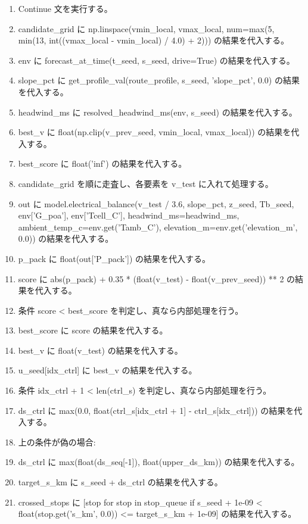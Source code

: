 \documentclass[a4paper,11pt]{article}
\begin{document}
\begin{enumerate}[leftmargin=1.8em]
\item     Continue 文を実行する。
\item   candidate\_grid に np.linspace(vmin\_local, vmax\_local, num=max(5, min(13, int((vmax\_local - vmin\_local) / 4.0) + 2))) の結果を代入する。
\item   env に forecast\_at\_time(t\_seed, s\_seed, drive=True) の結果を代入する。
\item   slope\_pct に get\_profile\_val(route\_profile, s\_seed, 'slope\_pct', 0.0) の結果を代入する。
\item   headwind\_ms に resolved\_headwind\_ms(env, s\_seed) の結果を代入する。
\item   best\_v に float(np.clip(v\_prev\_seed, vmin\_local, vmax\_local)) の結果を代入する。
\item   best\_score に float('inf') の結果を代入する。
\item   candidate\_grid を順に走査し、各要素を v\_test に入れて処理する。
\item     out に model.electrical\_balance(v\_test / 3.6, slope\_pct, z\_seed, Tb\_seed, env['G\_poa'], env['Tcell\_C'], headwind\_ms=headwind\_ms, ambient\_temp\_c=env.get('Tamb\_C'), elevation\_m=env.get('elevation\_m', 0.0)) の結果を代入する。
\item     p\_pack に float(out['P\_pack']) の結果を代入する。
\item     score に abs(p\_pack) + 0.35 * (float(v\_test) - float(v\_prev\_seed)) ** 2 の結果を代入する。
\item     条件 score < best\_score を判定し、真なら内部処理を行う。
\item       best\_score に score の結果を代入する。
\item       best\_v に float(v\_test) の結果を代入する。
\item   u\_seed[idx\_ctrl] に best\_v の結果を代入する。
\item   条件 idx\_ctrl + 1 < len(ctrl\_s) を判定し、真なら内部処理を行う。
\item     ds\_ctrl に max(0.0, float(ctrl\_s[idx\_ctrl + 1] - ctrl\_s[idx\_ctrl])) の結果を代入する。
\item     上の条件が偽の場合:
\item     ds\_ctrl に max(float(ds\_seq[-1]), float(upper\_ds\_km)) の結果を代入する。
\item   target\_s\_km に s\_seed + ds\_ctrl の結果を代入する。
\item   crossed\_stops に [stop for stop in stop\_queue if s\_seed + 1e-09 < float(stop.get('s\_km', 0.0)) <= target\_s\_km + 1e-09] の結果を代入する。

\end{enumerate}
\end{document}
